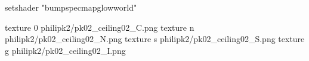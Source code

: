 setshader "bumpspecmapglowworld"


texture 0 philipk2/pk02_ceiling02_C.png
texture n philipk2/pk02_ceiling02_N.png
texture s philipk2/pk02_ceiling02_S.png
texture g philipk2/pk02_ceiling02_I.png

